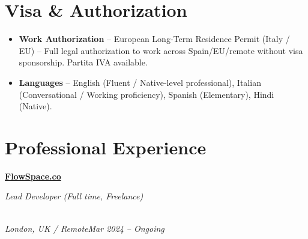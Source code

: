 \documentclass[a4paper,10pt]{article}
\newcommand{\role}[4]{\vspace{2pt}\noindent\hspace{0.6em}\parbox[t]{0.38\textwidth}{\raggedright\textbf{#1}}\hfill\parbox[t]{0.58\textwidth}{\raggedleft\textit{#2}}\\{\textit{#3}\hfill\textit{#4}}\vspace{1pt}}
\begin{document}
\section{Visa \& Authorization}
\begin{itemize}
\item \textbf{Work Authorization} -- European Long-Term Residence Permit (Italy / EU) -- Full legal authorization to work across Spain/EU/remote without visa sponsorship. Partita IVA available.
\item \textbf{Languages} -- English (Fluent / Native-level professional), Italian (Conversational / Working proficiency), Spanish (Elementary), Hindi (Native).
\end{itemize}

\section{Professional Experience}
\role{\href{https://flowspace.co}{FlowSpace.co}}{Lead Developer (Full time, Freelance)}{London, UK / Remote}{Mar 2024 -- Ongoing}
\end{document}
